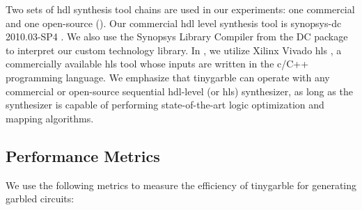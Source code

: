 Two sets of \acrshort{hdl} synthesis tool chains are used in our experiments: one commercial and one open-source ().
Our commercial \acrshort{hdl} level synthesis tool is \gls{synopsys-dc} 2010.03-SP4 \cite{tool:DesignCompiler}.
We also use the Synopsys Library Compiler from the DC package to interpret our custom technology library.
In , we utilize Xilinx Vivado \acrshort{hls} \cite{tool:Vivado}, a commercially available \acrshort{hls} tool whose inputs are written in the \gls{c}/C++ programming language.
We emphasize that \gls{tinygarble} can operate with any commercial or open-source sequential \acrshort{hdl}-level (or \acrshort{hls}) synthesizer, as long as the synthesizer is capable of performing state-of-the-art logic optimization and mapping algorithms.

\subsection{Performance Metrics}\label{ssec:eval-tinygarble-metric}
We use the following metrics to measure the efficiency of \gls{tinygarble} for generating garbled circuits:

